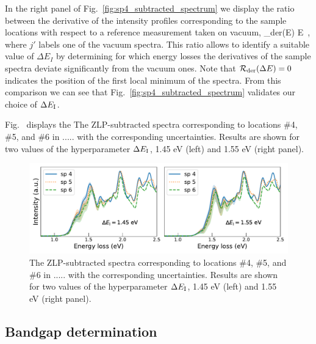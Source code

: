 In the right panel of  Fig.~\ref{fig:sp4_subtracted_spectrum} we display the ratio
between the derivative of the intensity profiles corresponding to the sample locations
with respect to a reference measurement taken on vacuum,
\be
{}_{\rm der}(\Delta E) \equiv 
{}\lp \Delta E\rp \, ,
\ee
where $j'$ labels one of the vacuum spectra.
%
This ratio allows to identify a suitable value of $\Delta E_{I}$ by determining
for which energy losses the derivatives of the sample spectra deviate significantly
from the vacuum ones.
%
Note that $\mathcal{R}_{\rm der}(\Delta E)=0$ indicates the position of the first
local minimum of the spectra.
%
From this comparison we can see that Fig.~\ref{fig:sp4_subtracted_spectrum} validates our choice of
$\Delta E_{\rm I}$.

Fig.~\label{fig:subtracted_spectra_comp} displays the
The ZLP-subtracted spectra corresponding to locations \#4, \#5, and \#6
    in ..... with the corresponding uncertainties.
    Results are shown for two values of the hyperparameter $\Delta E_{\rm I}$,
    1.45 eV (left) and 1.55 eV (right panel).

\begin{figure}[t]
\begin{centering}
  \includegraphics[width=0.99\linewidth]{plots/subtracted_spectra_comp.pdf}
  \caption{The ZLP-subtracted spectra corresponding to locations \#4, \#5, and \#6
    in ..... with the corresponding uncertainties.
    Results are shown for two values of the hyperparameter $\Delta E_{\rm I}$,
    1.45 eV (left) and 1.55 eV (right panel).
  }
\label{fig:subtracted_spectra_comp}
\end{centering}
\end{figure}

\subsection{Bandgap determination}



